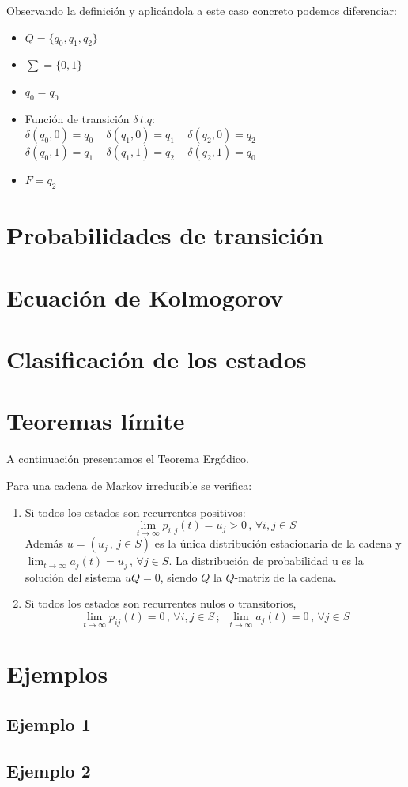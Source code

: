 \documentclass[12pt,a4paper]{article}
\begin{document}
Observando la definición y aplicándola a este caso concreto podemos diferenciar:
\begin{itemize}
\item $Q=\{q_0,q_1,q_2 \}$
\item $\sum = \{0,1\}$
\item $q_0=q_0$
\item Función de transición $\delta \, t.q$:
\\
$\delta(q_0,0)=q_0 \,\,\,\,\,\,\, \delta(q_1,0)=q_1\,\,\,\,\,\,\, \delta(q_2,0)=q_2$
\\
$\delta(q_0,1)=q_1 \,\,\,\,\,\,\,  \delta(q_1,1)=q_2 \,\,\,\,\,\,\,\delta(q_2,1)=q_0$
\item $F={q_2}$
\end{itemize}
\section{Probabilidades de transición}
\section{Ecuación de Kolmogorov}
\section{Clasificación de los estados}
\section{Teoremas límite}
A continuación presentamos el Teorema Ergódico.
\begin{theorem}
Para una cadena de Markov irreducible se verifica:
\begin{enumerate}
\item Si todos los estados son recurrentes positivos:
$$\lim_{t\rightarrow\infty}p_{i,j}(t)=u_j>0 \, , \, \forall i,j\in S$$
Además $u=(u_j \, , \, j\in S)$ es la única distribución estacionaria de la cadena y $\displaystyle\lim_{t\rightarrow\infty}a_j (t)=u_j \, , \, \forall j\in S$. La distribución de probabilidad u es la solución del sistema $uQ=0$, siendo $Q$ la $Q$-matriz de la cadena.
\item Si todos los estados son recurrentes nulos o transitorios,
$$\lim_{t\rightarrow\infty}p_{ij}(t)=0\, , \, \forall i,j \in S\, ;\,\,\, \lim_{t\rightarrow\infty}a_j (t)=0\, , \, \forall j\in S$$
\end{enumerate}
\end{theorem}
\section{Ejemplos}
\subsection{Ejemplo 1}
\subsection{Ejemplo 2}
\end{document}
